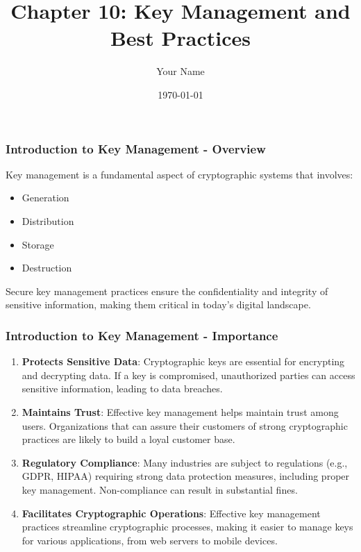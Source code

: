 \documentclass{beamer}
\title{Chapter 10: Key Management and Best Practices}
\author{Your Name}
\institute{Your Institution}
\date{\today}
\begin{document}
\frame{\titlepage}

\begin{frame}[fragile]
    \frametitle{Introduction to Key Management - Overview}
    Key management is a fundamental aspect of cryptographic systems that involves:
    \begin{itemize}
        \item Generation
        \item Distribution
        \item Storage
        \item Destruction
    \end{itemize}
    Secure key management practices ensure the confidentiality and integrity of sensitive information, making them critical in today's digital landscape.
\end{frame}

\begin{frame}[fragile]
    \frametitle{Introduction to Key Management - Importance}
    \begin{enumerate}
        \item \textbf{Protects Sensitive Data}: 
        Cryptographic keys are essential for encrypting and decrypting data. If a key is compromised, unauthorized parties can access sensitive information, leading to data breaches.
        
        \item \textbf{Maintains Trust}: 
        Effective key management helps maintain trust among users. Organizations that can assure their customers of strong cryptographic practices are likely to build a loyal customer base.
        
        \item \textbf{Regulatory Compliance}: 
        Many industries are subject to regulations (e.g., GDPR, HIPAA) requiring strong data protection measures, including proper key management. Non-compliance can result in substantial fines.
        
        \item \textbf{Facilitates Cryptographic Operations}: 
        Effective key management practices streamline cryptographic processes, making it easier to manage keys for various applications, from web servers to mobile devices.
    \end{enumerate}
\end{frame}
\end{document}
